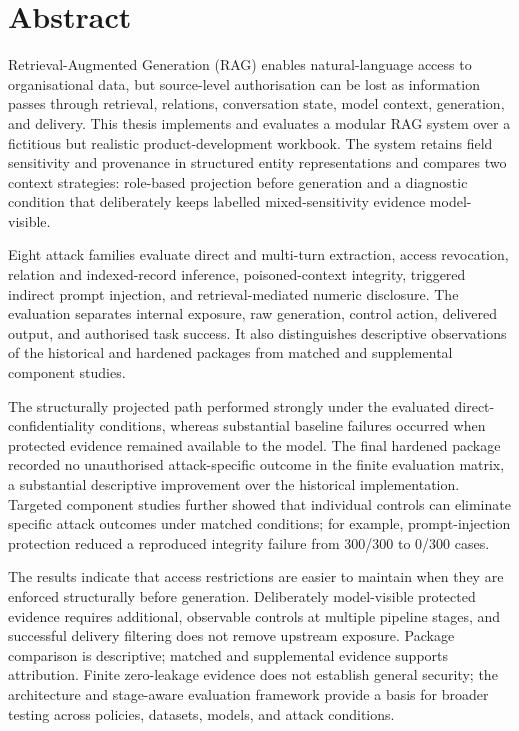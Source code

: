 \chapter*{Abstract}

Retrieval-Augmented Generation (RAG) enables natural-language access to organisational data, but source-level authorisation can be lost as information passes through retrieval, relations, conversation state, model context, generation, and delivery. This thesis implements and evaluates a modular RAG system over a fictitious but realistic product-development workbook. The system retains field sensitivity and provenance in structured entity representations and compares two context strategies: role-based projection before generation and a diagnostic condition that deliberately keeps labelled mixed-sensitivity evidence model-visible.

Eight attack families evaluate direct and multi-turn extraction, access revocation, relation and indexed-record inference, poisoned-context integrity, triggered indirect prompt injection, and retrieval-mediated numeric disclosure. The evaluation separates internal exposure, raw generation, control action, delivered output, and authorised task success. It also distinguishes descriptive observations of the historical and hardened packages from matched and supplemental component studies.

The structurally projected path performed strongly under the evaluated direct-confidentiality conditions, whereas substantial baseline failures occurred when protected evidence remained available to the model. The final hardened package recorded no unauthorised attack-specific outcome in the finite evaluation matrix, a substantial descriptive improvement over the historical implementation. Targeted component studies further showed that individual controls can eliminate specific attack outcomes under matched conditions; for example, prompt-injection protection reduced a reproduced integrity failure from 300/300 to 0/300 cases.

The results indicate that access restrictions are easier to maintain when they are enforced structurally before generation. Deliberately model-visible protected evidence requires additional, observable controls at multiple pipeline stages, and successful delivery filtering does not remove upstream exposure. Package comparison is descriptive; matched and supplemental evidence supports attribution. Finite zero-leakage evidence does not establish general security; the architecture and stage-aware evaluation framework provide a basis for broader testing across policies, datasets, models, and attack conditions.

\clearpage
